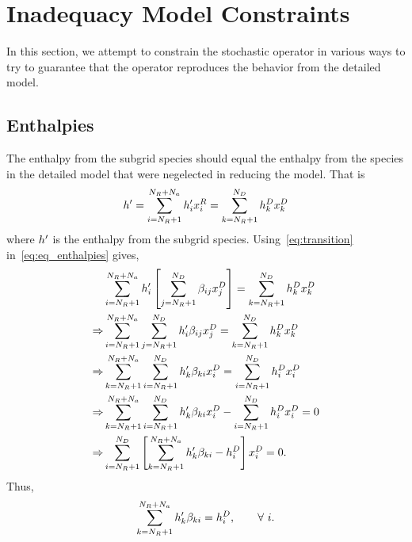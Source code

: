 \section{Inadequacy Model Constraints}
In this section, we attempt to constrain the stochastic operator in various ways to try to guarantee that the operator reproduces the behavior from the detailed model.

\subsection{Enthalpies}
The enthalpy from the subgrid species should equal the enthalpy from the species in the detailed model that were negelected in reducing the model.  That is
\begin{align}
  h^{\prime} = \sum_{i=N_{R} + 1}^{N_{R} + N_{a}}{h_{i}^{\prime}x_{i}^{R}} = \sum_{k=N_{R}+1}^{N_{D}}{h_{k}^{D}x_{k}^{D}} \label{eq:eq_enthalpies}
\end{align}
where $h^{\prime}$ is the enthalpy from the subgrid species.
Using~\eqref{eq:transition} in~\eqref{eq:eq_enthalpies} gives,
\begin{align}
  &\sum_{i=N_{R}+1}^{N_{R} + N_{a}}{h_{i}^{\prime}\left[\sum_{j=N_{R}+1}^{N_{D}}{\beta_{ij}x_{j}^{D}}\right]} = \sum_{k=N_{R}+1}^{N_{D}}{h_{k}^{D}x_{k}^{D}} \\
  \Rightarrow & \sum_{i=N_{R} + 1}^{N_{R} + N_{a}}\sum_{j=N_{R}+1}^{N_{D}}{h_{i}^{\prime}\beta_{ij}x_{j}^{D}} = \sum_{k=N_{R}+1}^{N_{D}}{h_{k}^{D}x_{k}^{D}} \\
  \Rightarrow & \sum_{k=N_{R} + 1}^{N_{R} + N_{a}}\sum_{i=N_{R}+1}^{N_{D}}{h_{k}^{\prime}\beta_{ki}x_{i}^{D}} = \sum_{i=N_{R}+1}^{N_{D}}{h_{i}^{D}x_{i}^{D}} \\
  \Rightarrow & \sum_{k=N_{R} + 1}^{N_{R} + N_{a}}\sum_{i=N_{R}+1}^{N_{D}}{h_{k}^{\prime}\beta_{ki}x_{i}^{D}} - \sum_{i=N_{R}+1}^{N_{D}}{h_{i}^{D}x_{i}^{D}} = 0 \\
  \Rightarrow & \sum_{i=N_{R} + 1}^{N_{D}}\left[\sum_{k=N_{R}+1}^{N_{R} + N_{a}}h_{k}^{\prime}\beta_{ki} - h_{i}^{D}\right]x_{i}^{D} = 0.
\end{align}
Thus,
\begin{align}
  \sum_{k=N_{R}+1}^{N_{R}+N_{a}}h_{k}^{\prime}\beta_{ki} = h_{i}^{D}, \qquad \forall \ i.
\end{align}
